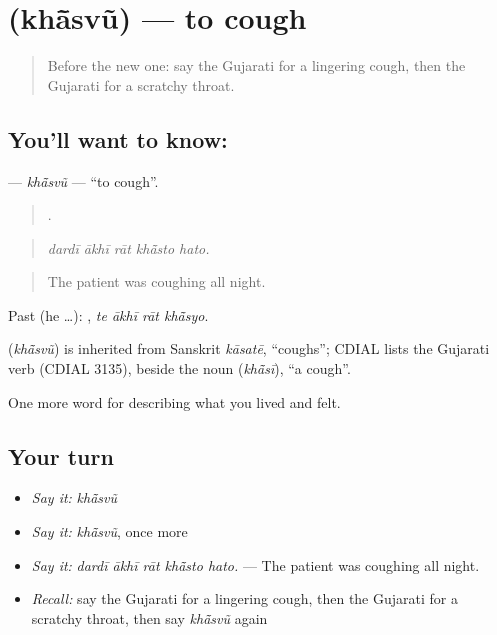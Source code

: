 \section[\texorpdfstring{\gu{ખાંસવું} (khā̃svũ)}{ખાંસવું (khā̃svũ)}]{ (khā̃svũ) — to cough}

\label{lesson:GU-C478-khansvu}



\begin{quote}
Before the new one: say the Gujarati for a lingering cough, then the Gujarati for a scratchy throat.
\end{quote}

\subsection*{You'll want to know: }
\textbf{} — \emph{khā̃svũ} — \textquotedblleft{}to cough\textquotedblright{}.

\begin{quote}
    .
\end{quote}

\begin{quote}
\emph{dardī ākhī rāt khā̃sto hato.}
\end{quote}

\begin{quote}
The patient was coughing all night.
\end{quote}

Past (he …):    , \emph{te ākhī rāt khā̃syo}.

\begin{cousinweb}
\textbf{} (\emph{khā̃svũ}) is inherited from Sanskrit \emph{kāsatē}, \textquotedblleft{}coughs\textquotedblright{}; CDIAL lists the Gujarati verb (CDIAL 3135), beside the noun \textbf{} (\emph{khā̃sī}), \textquotedblleft{}a cough\textquotedblright{}.
\end{cousinweb}

\begin{grammarlens}[title={What you've built}]
One more word for describing what you lived and felt.
\end{grammarlens}

\subsection*{Your turn}
\begin{itemize}
\raggedright
  \item \emph{Say it:} \emph{khā̃svũ}
  \item \emph{Say it:} \emph{khā̃svũ}, once more
  \item \emph{Say it:} \emph{dardī ākhī rāt khā̃sto hato.} — The patient was coughing all night.
  \item \emph{Recall:} say the Gujarati for a lingering cough, then the Gujarati for a scratchy throat, then say \emph{khā̃svũ} again
\end{itemize}

